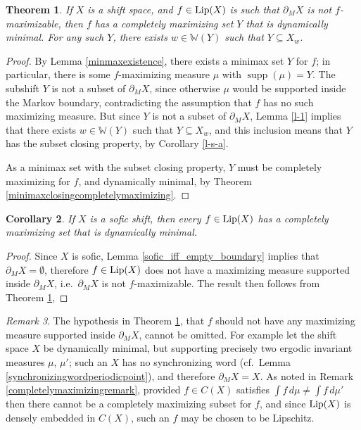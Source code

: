 \documentclass[reqno,11pt]{amsart}
\newtheorem{thm}{Theorem}[section]
\newtheorem{cor}[thm]{Corollary}
\theoremstyle{definition}
\theoremstyle{remark}
\theoremstyle{remark}
\newtheorem{rem}[thm]{Remark}
\def\lip{{\rm Lip}}
\newcommand{\supp}{\operatorname{supp}}
\def\w{\mathbb{W}}
\numberwithin{equation}{section}
\begin{document}
\begin{thm}\label{l-6} If $X$ is a shift space, and $f\in\lip(X)$ is such that $\partial_M X$ is not $f$-maximizable,
then $f$ has a completely maximizing set $Y$ that is dynamically minimal.
For any such 
$Y$, there exists
$w\in\w(Y)$
such that 
$Y\subseteq X_w$.
\end{thm}
\begin{proof}
By Lemma \ref{minmaxexistence}, there exists a minimax set $Y$ for $f$;
in particular, there is some $f$-maximizing measure $\mu$ with $\supp(\mu)=Y$.
The subshift $Y$ is not a subset of $\partial_M X$, since otherwise $\mu$ would be supported inside the Markov boundary, contradicting the assumption that $f$ has no such maximizing measure.
But since $Y$ is not a subset of $\partial_M X$,  Lemma \ref{l-1} implies that there exists $w\in\w(Y)$
such that 
 $Y\subseteq X_w$,
and this inclusion means that $Y$ has the subset closing property, by Corollary \ref{l-s-a}.

As a minimax set with the subset closing property, $Y$ must be completely maximizing for $f$,
and dynamically minimal,
by Theorem \ref{minimaxclosingcompletelymaximizing}.
\end{proof}




\begin{cor}
If $X$ is a sofic shift, then every $f\in\lip(X)$
has a completely maximizing set that is dynamically minimal.
\end{cor}
\begin{proof}
Since $X$ is sofic, Lemma \ref{sofic_iff_empty_boundary} implies that $\partial_M X=\emptyset$,
therefore $f\in\lip(X)$ does not have a maximizing measure supported inside $\partial_M X$,
i.e.~$\partial_M X$ is not $f$-maximizable.
The result then follows from Theorem \ref{l-6},   
\end{proof}


\begin{rem}
The hypothesis in Theorem \ref{l-6},
that $f$ should not have any maximizing measure supported inside $\partial_M X$,
cannot be omitted.
For example let the shift space $X$ be dynamically minimal, but supporting precisely two ergodic invariant measures $\mu$, $\mu'$; such an $X$ has no synchronizing word (cf.~Lemma \ref{synchronizingwordperiodicpoint}), 
and therefore $\partial_M X = X$.
As noted in Remark \ref{completelymaximizingremark}, provided $f\in C(X)$
satisfies $\int f\, d\mu \neq \int f\, d\mu'$ then there cannot be a completely maximizing subset for $f$,
and since $\lip(X)$ is densely embedded in $C(X)$, such an $f$ may be chosen to be Lipschitz.
\end{rem}
\end{document}
